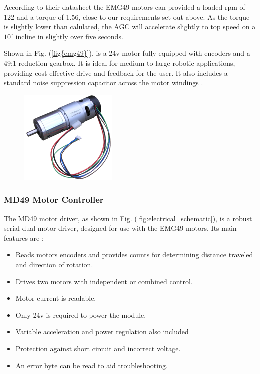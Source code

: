 \documentclass[11pt,landscape]{article}
\begin{document}
\begin{multicols}{3}
According to their datasheet the EMG49 motors can provided a loaded rpm of 122
and a torque of 1.56, close to our requirements set out above. As the torque is
slightly lower than calulated, the AGC will accelerate slightly to top speed on
a $10^\circ$ incline in slightly over five seconds.

Shown in Fig. (\ref{fig{emg49}}), is a 24v motor fully equipped with
encoders and a 49:1 reduction gearbox. It is ideal for medium to large robotic
applications, providing cost effective drive and feedback for the user. It also
includes a standard noise suppression capacitor across the motor windings
\cite{emg49data}.
\begin{figure}[H]
    \begin{center}
    \includegraphics[]{emg49.png}
    \label{fig:emg49}
    \end{center}
\end{figure}

\subsubsection{MD49 Motor Controller}
The MD49 motor driver, as shown in Fig. (\ref{fig:electrical_schematic}), is a
robust serial dual motor driver, designed for use with the EMG49 motors. Its
main features are \cite{md49data}:

\begin{itemize}
    \item Reads motors encoders and provides counts for determining distance traveled and direction of rotation.
    \item Drives two motors with independent or combined control. 
    \item Motor current is readable.
    \item Only 24v is required to power the module.
    \item Variable acceleration and power regulation also included
    \item Protection against short circuit and incorrect voltage. 
    \item An error byte can be read to aid troubleshooting.
\end{itemize}


\end{multicols}
\end{document}
